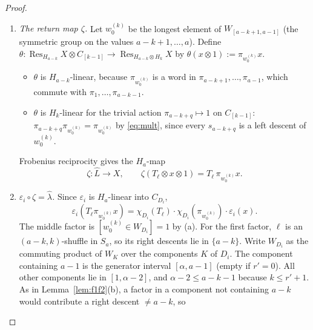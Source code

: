 \documentclass[11pt]{amsart}
\newcommand{\Ind}{\operatorname{Ind}}
\newcommand{\Res}{\operatorname{Res}}
\newcommand{\sq}{\boxtimes}
\newcommand{\ok}{\mathrm{ok}}
\theoremstyle{plain}
\theoremstyle{definition}
\begin{document}
\begin{proof}
\begin{enumerate}[label=\textup{Step \arabic*.},leftmargin=3.6em,itemsep=3pt]
For the second inclusion, let $E':=E_j\cap[k-1]$. The restriction $\delta_j:\Res_{H_k}Y\to C_{E'}$ is $H_k$-linear, so $\mathrm{id}\otimes\delta_j$ induces a surjective $H_a$-map
\[
\Ind(\mathrm{id}\sq\delta_j):\widetilde L\to\widehat L':=\Ind_{H_{a-k}\otimes H_k}^{H_a}\bigl(\Res_{H_{a-k}}X\sq C_{E'}\bigr),
\]
and $\widetilde\lambda=\widehat\lambda\circ\Ind(\mathrm{id}\sq\delta_j)$, where $\widehat\lambda(T_\ell\otimes x\otimes1):=[\ell\ \ok]\,\varepsilon_i(x)$. Because $\Ind(\mathrm{id}\sq\delta_j)$ is onto and $\widetilde\lambda$ is $H_a$-linear, $\widehat\lambda$ is $H_a$-linear. Now take $z=T_{\mathrm{id}}\otimes x_i\otimes1$, i.e.\ $\ell=A^{a-k}B^k$. Since $\alpha-1\le a-k$ by the first part, $\ell$ is ok and $\widehat\lambda(z)=1$. Apply $\pi_{a-k+q}$ for $q\in[1,k-1]$:
\begin{itemize}[itemsep=1pt]
\item by rule $BB$, $\pi_{a-k+q}z=[q\in E']\,z$;
\item by $H_a$-linearity into $C_{D_i}$, $\widehat\lambda(\pi_{a-k+q}z)=[a-k+q\in D_i]=1$, using the first inclusion.
\end{itemize}
Hence $[q\in E']=1$ for all $q\in[1,k-1]$, so $E'=[k-1]$, i.e.\ $[1,k-1]\subseteq E_j$. In particular $\widehat L'=\widehat L$.
\item \emph{The return map $\zeta$.} Let $w_0^{(k)}$ be the longest element of $W_{[a-k+1,a-1]}$ (the symmetric group on the values $a-k+1,\dots,a$). Define $\theta:\Res_{H_{a-k}}X\otimes C_{[k-1]}\to\Res_{H_{a-k}\otimes H_k}X$ by $\theta(x\otimes1):=\pi_{w_0^{(k)}}x$.
\begin{itemize}[itemsep=1pt]
\item $\theta$ is $H_{a-k}$-linear, because $\pi_{w_0^{(k)}}$ is a word in $\pi_{a-k+1},\dots,\pi_{a-1}$, which commute with $\pi_1,\dots,\pi_{a-k-1}$.
\item $\theta$ is $H_k$-linear for the trivial action $\pi_{a-k+q}\mapsto1$ on $C_{[k-1]}$: $\pi_{a-k+q}\pi_{w_0^{(k)}}=\pi_{w_0^{(k)}}$ by \eqref{eq:mult}, since every $s_{a-k+q}$ is a left descent of $w_0^{(k)}$.
\end{itemize}
Frobenius reciprocity gives the $H_a$-map
\[
\zeta:\widehat L\to X,\qquad \zeta(T_\ell\otimes x\otimes1)=T_\ell\,\pi_{w_0^{(k)}}x.
\]
\item \emph{$\varepsilon_i\circ\zeta=\widehat\lambda$.} Since $\varepsilon_i$ is $H_a$-linear into $C_{D_i}$,
\[
\varepsilon_i(T_\ell\pi_{w_0^{(k)}}x)=\chi_{D_i}(T_\ell)\cdot\chi_{D_i}(\pi_{w_0^{(k)}})\cdot\varepsilon_i(x).
\]
The middle factor is $[w_0^{(k)}\in W_{D_i}]=1$ by (a). For the first factor, $\ell$ is an $(a-k,k)$-shuffle in $S_a$, so its right descents lie in $\{a-k\}$. Write $W_{D_i}$ as the commuting product of $W_K$ over the components $K$ of $D_i$. The component containing $a-1$ is the generator interval $[\alpha,a-1]$ (empty if $r'=0$). All other components lie in $[1,\alpha-2]$, and $\alpha-2\le a-k-1$ because $k\le r'+1$. As in Lemma~\ref{lem:f1f2}(b), a factor in a component not containing $a-k$ would contribute a right descent $\ne a-k$, so

\end{enumerate}
\end{proof}
\end{document}
